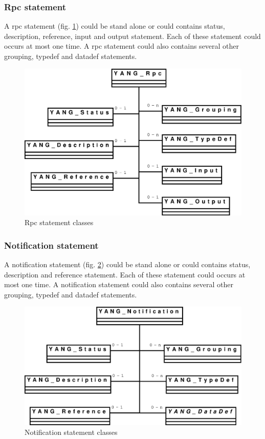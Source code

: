 \documentclass[a4paper]{article}
\begin{document}
\subsubsection{Rpc statement}

A  rpc  statement (fig. \ref{rpc}) could  be  stand  alone  or could  contains  status,
description,  reference, input  and output  statement.  Each  of these
statement could occurs  at most one time.  A  rpc statement could also
contains several other grouping, typedef and datadef statements.
\begin{figure}[htbp]
\begin{center}
\includegraphics[scale = .3]{rpc.eps}
\end{center}
\caption{Rpc statement classes}
\label{rpc}
\end{figure}

\subsubsection{Notification statement}

A  notification  statement (fig.  \ref{notification})  could be  stand
alone or  could contains status, description  and reference statement.
Each of these statement could  occurs at most one time. A notification
statement  could also  contains  several other  grouping, typedef  and
datadef statements.
\begin{figure}[htbp]
\begin{center}
\includegraphics[scale = .3]{notification.eps}
\end{center}
\caption{Notification statement classes}
\label{notification}
\end{figure}
\end{document}
